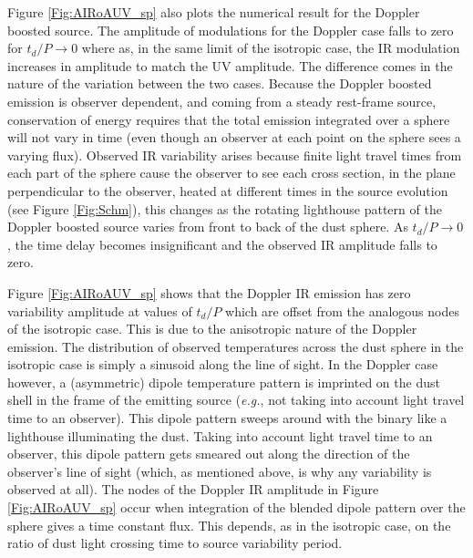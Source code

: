 Figure \ref{Fig:AIRoAUV_sp} also plots the numerical result for the Doppler
boosted source. The amplitude of modulations for the Doppler case falls to
zero for $t_d/P \rightarrow 0$ where as, in the same limit of the isotropic
case, the IR modulation increases in amplitude to match the UV amplitude. The
difference comes in the nature of the variation between the two cases. Because
the Doppler boosted emission is observer dependent, and coming from a steady
rest-frame source, conservation of energy requires that the total emission
integrated over a sphere will not vary in time (even though an observer at
each point on the sphere sees a varying flux). Observed IR variability arises
because finite light travel times from each part of the sphere cause the
observer to see each cross section, in the plane perpendicular to the
observer, heated at different times in the source evolution (see Figure
\ref{Fig:Schm}), this changes as the rotating lighthouse pattern of the
Doppler boosted source varies from front to back of the dust sphere. As $t_d/P
\rightarrow 0$, the time delay becomes insignificant and the observed IR
amplitude falls to zero.




Figure \ref{Fig:AIRoAUV_sp} shows that the Doppler IR emission has zero
variability amplitude at values of $t_d/P$ which are offset from the analogous
nodes of the isotropic case. This is due to the anisotropic nature of the
Doppler emission. The distribution of observed temperatures across the dust
sphere in the isotropic case is simply a sinusoid along the line of sight. In
the Doppler case however, a (asymmetric) dipole temperature pattern is
imprinted on the dust shell in the frame of the emitting source
(\textit{e.g.}, not taking into account light travel time to an observer).
This dipole pattern sweeps around with the binary like a lighthouse
illuminating the dust. Taking into account light travel time to an observer,
this dipole pattern gets smeared out along the direction of the observer's
line of sight (which, as mentioned above, is why any variability is observed
at all). The nodes of the Doppler IR amplitude in Figure \ref{Fig:AIRoAUV_sp}
occur when integration of the blended dipole pattern over the sphere gives a
time constant flux. This depends, as in the isotropic case, on the ratio of
dust light crossing time to source variability period.







